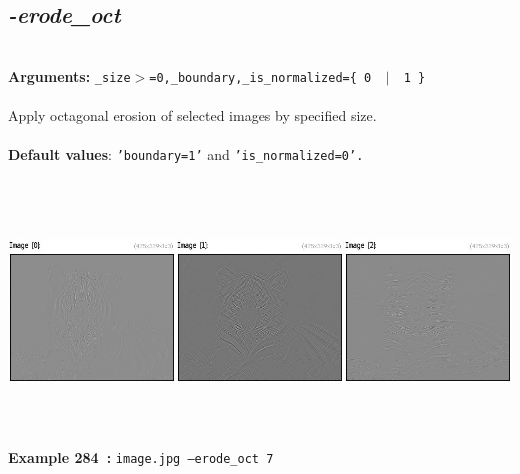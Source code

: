 \documentclass[a4paper,11pt,twoside]{book}
\begin{document}
\subsection{\emph{-erode\_oct} }\vspace*{-0.5em}
~\\\textbf{Arguments: } 
{\small \texttt{\_size$>$=0,\_boundary,\_is\_normalized=\{ 0 ~$|$~ 1 \}}}\\~\\
Apply octagonal erosion of selected images by specified size.
~\\~\\\textbf{Default values}: {\small \texttt{'boundary=1'} and \texttt{'is\_normalized=0'.}}
\begin{center}\includegraphics[keepaspectratio=true,height=7cm,width=\textwidth]{img/gmic_def284.jpg}\\
{\footnotesize \textbf{Example 284~:} \texttt{image.jpg --erode\_oct 7}}
\end{center}
\end{document}
